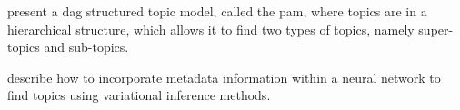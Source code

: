\citet{li2006pachinko} present a \gls{dag} structured topic model, called the \acrfull{pam}, where topics are in a hierarchical structure, which allows it to find two types of topics, namely super-topics and sub-topics. 


\citet{card2017neural} describe how to incorporate metadata information within a neural network to find topics using variational inference methods.

